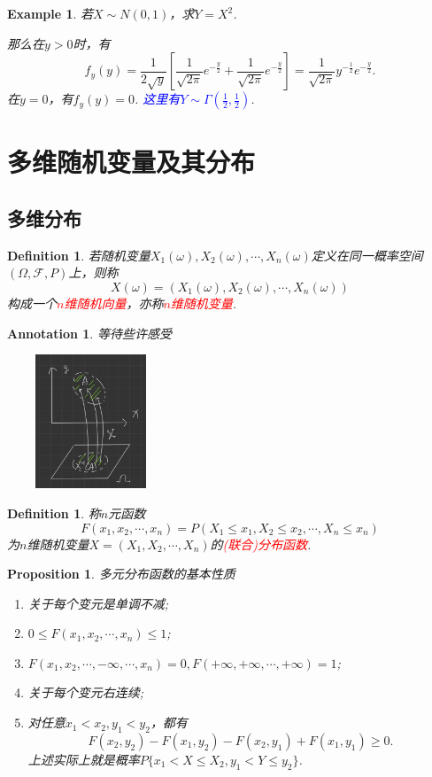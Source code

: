 \documentclass{article}
\newtheorem{proposition}[theorem]{Proposition}
\newtheorem{example}[theorem]{Example}
\newtheorem{definition}[theorem]{Definition}
\newtheorem{annotation}[theorem]{Annotation}
\newcommand{\redt}[1]{\textcolor{red}{#1}}
\newcommand{\bluet}[1]{\textcolor{blue}{#1}}
\begin{document}
\begin{example}\label{normal-distribution-square}
\rm 若$X \sim N(0,1)$，求$Y=X^2$.

那么在$y > 0$时，有
$$
f_y(y) = \frac{1}{2\sqrt{y}}\left[ \frac{1}{\sqrt{2\pi}} e^{-\frac{y}{2}} + \frac{1}{\sqrt{2\pi}} e^{-\frac{y}{2}} \right] = \frac{1}{\sqrt{2\pi}}y^{-\frac{1}{2}}e^{-\frac{y}{2}}. 
$$
在$y=0$，有$f_y(y) = 0$. \bluet{这里有$Y \sim \Gamma(\frac{1}{2},\frac{1}{2})$}.
\end{example}


\newpage
\section{多维随机变量及其分布}

\subsection{多维分布}
\begin{definition}
\rm 若随机变量$X_1(\omega),X_2(\omega),\cdots,X_n(\omega)$定义在同一概率空间$(\Omega,\mathscr{F},P)$上，则称
$$
X(\omega) = (X_1(\omega),X_2(\omega),\cdots,X_n(\omega))
$$
构成一个\redt{$n$维随机向量}，亦称\redt{$n$维随机变量}.
\end{definition}

\begin{annotation}
\rm 等待些许感受
\begin{center}
\includegraphics[width=5cm, height=4cm]{images/random_vector.jpg}
\end{center}
\end{annotation}

\begin{definition}
\rm 称$n$元函数
$$
F(x_1,x_2,\cdots,x_n) = P(X_1 \leq x_1, X_2 \leq x_2,\cdots, X_n \leq x_n)
$$
为$n$维随机变量$X=(X_1,X_2,\cdots,X_n)$的\redt{(联合)分布函数}. 
\end{definition}

\begin{proposition}
\rm 多元分布函数的基本性质
\begin{enumerate}
	\item 关于每个变元是单调不减;
	\item $0 \leq F(x_1,x_2,\cdots,x_n) \leq 1$;
	\item $F(x_1,x_2,\cdots,-\infty,\cdots,x_n) = 0,F(+\infty,+\infty,\cdots,+\infty) = 1$;
	\item 关于每个变元右连续;
	\item 对任意$x_1 < x_2, y_1 < y_2$，都有
	$$
	F(x_2,y_2)-F(x_1,y_2) - F(x_2,y_1) + F(x_1,y_1) \geq 0.
	$$
	上述实际上就是概率$P\{x_1 < X \leq X_2, y_1 < Y \leq y_2\}$.
\end{enumerate}
\end{proposition}
\end{document}
